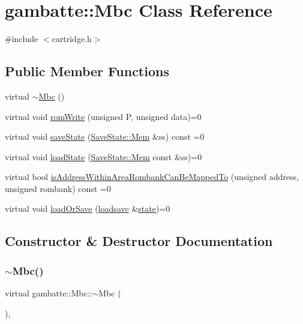 \hypertarget{classgambatte_1_1Mbc}{}\section{gambatte\+:\+:Mbc Class Reference}
\label{classgambatte_1_1Mbc}


{\ttfamily \#include $<$cartridge.\+h$>$}

\subsection*{Public Member Functions}
\begin{DoxyCompactItemize}
\item 
virtual \hyperlink{classgambatte_1_1Mbc_a518adcdff389a3e92774e683f1af6059}{$\sim$\+Mbc} ()
\item 
virtual void \hyperlink{classgambatte_1_1Mbc_a0c05b231bad52fb08784074ddfd2e878}{rom\+Write} (unsigned P, unsigned data)=0
\item 
virtual void \hyperlink{classgambatte_1_1Mbc_a255f6aa48eb21c8b95b23d978b1f4d21}{save\+State} (\hyperlink{structgambatte_1_1SaveState_1_1Mem}{Save\+State\+::\+Mem} \&ss) const =0
\item 
virtual void \hyperlink{classgambatte_1_1Mbc_a894d6ad53d017b25a03bf45f7b910f6d}{load\+State} (\hyperlink{structgambatte_1_1SaveState_1_1Mem}{Save\+State\+::\+Mem} const \&ss)=0
\item 
virtual bool \hyperlink{classgambatte_1_1Mbc_add5e1e03b46b35d6ca593e46dba50477}{is\+Address\+Within\+Area\+Rombank\+Can\+Be\+Mapped\+To} (unsigned address, unsigned rombank) const =0
\item 
virtual void \hyperlink{classgambatte_1_1Mbc_aca51cb12ec7840299efd24e5fb5359df}{load\+Or\+Save} (\hyperlink{classgambatte_1_1loadsave}{loadsave} \&\hyperlink{ppu_8cpp_a2f2eca6997ee7baf8901725ae074d45b}{state})=0
\end{DoxyCompactItemize}


\subsection{Constructor \& Destructor Documentation}
\mbox{\label{classgambatte_1_1Mbc_a518adcdff389a3e92774e683f1af6059}} 
\subsubsection{\texorpdfstring{$\sim$\+Mbc()}{~Mbc()}}
{\footnotesize\ttfamily virtual gambatte\+::\+Mbc\+::$\sim$\+Mbc (\begin{DoxyParamCaption}{ }\end{DoxyParamCaption})\hspace{0.3cm}{\ttfamily [inline]}, {\ttfamily [virtual]}}



